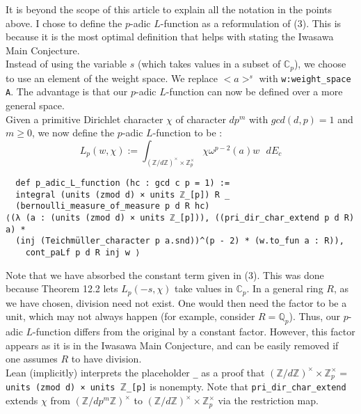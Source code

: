 \documentclass[a4paper,UKenglish,cleveref, autoref, thm-restate]{lipics-v2021}
\newcommand{\lean}[1]{\texttt{#1}\xspace} %
\begin{document}
It is beyond the scope of this article to explain all the notation in the points above. I chose to
define the $p$-adic $L$-function as a reformulation of (3). This is because it is the most optimal
definition that helps with stating the Iwasawa Main Conjecture. \\

Instead of using the variable $s$ (which takes values in a subset of $\mathbb{C}_p$), we choose to use an element of the weight space. We replace
$<a>^s$ with \lean{w:weight\_space A}. The advantage is that our $p$-adic $L$-function can now be defined over a more general space. \\

Given a primitive Dirichlet character $\chi$ of character $dp^m$ with $gcd(d, p) = 1$ and $m \ge 0$,
we now define the $p$-adic $L$-function to be :
$$ L_p(w, \chi) := \int_{(\mathbb{Z}/d \mathbb{Z})^{\times} \times \mathbb{Z}_p^{\times}}
\chi \omega^{p - 2} (a) w \text{    } dE_c $$

\begin{lstlisting}
  def p_adic_L_function (hc : gcd c p = 1) :=
  integral (units (zmod d) × units ℤ_[p]) R _ 
  (bernoulli_measure_of_measure p d R hc)
⟨(λ (a : (units (zmod d) × units ℤ_[p])), ((pri_dir_char_extend p d R) a) *
  (inj (Teichmüller_character p a.snd))^(p - 2) * (w.to_fun a : R)), 
    cont_paLf p d R inj w ⟩
\end{lstlisting}

Note that we have absorbed the constant term given in (3). This was done because Theorem 12.2 lets $L_p(-s, \chi)$ take values in $\mathbb{C}_p$. 
In a general ring $R$, as we have chosen, division need not exist. One would then need the factor to be a unit, which may not always happen 
(for example, consider $R = \mathbb{Q}_p$). Thus, our $p$-adic $L$-function differs from the original by a constant factor. 
However, this factor appears as it is in the Iwasawa Main Conjecture, and can be easily removed if one assumes $R$ to have division. \\

Lean (implicitly) interprets the placeholder \lean{\_} as a proof that 
\newline $(\mathbb{Z}/d \mathbb{Z})^{\times} \times \mathbb{Z}_p^{\times} = $ \lean{units (zmod d) × units $\mathbb{Z}$\_[p]} is nonempty. 
Note that \lean{pri\_dir\_char\_extend} extends $\chi$
from $(\mathbb{Z}/ dp^m \mathbb{Z})^{\times}$ to $(\mathbb{Z}/ d \mathbb{Z})^{\times} \times \mathbb{Z}_p^{\times}$ via the restriction map. \\
\end{document}
